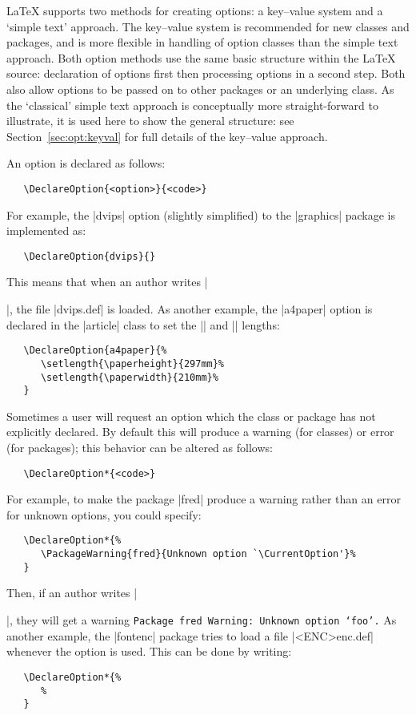 \documentclass{ltxguide}
\begin{document}
\LaTeX{} supports two methods for creating options: a key--value system and a
`simple text' approach. The key--value system is recommended for new classes
and packages, and is more flexible in handling of option classes than the
simple text approach. Both option methods use the same basic structure within
the \LaTeX{} source: declaration of options first then processing options in a
second step. Both also allow options to be passed on to other packages or an
underlying class. As the `classical' simple text approach is conceptually more
straight-forward to illustrate, it is used here to show the general structure:
see Section~\ref{sec:opt:keyval} for full details of the key--value approach.

An option is declared as follows:
\begin{verbatim}
   \DeclareOption{<option>}{<code>}
\end{verbatim}
For example, the |dvips| option (slightly simplified)
to the |graphics| package is implemented as:
\begin{verbatim}
   \DeclareOption{dvips}{}
\end{verbatim}
This means that when an author writes |\usepackage[dvips]{graphics}|, the file
|dvips.def| is loaded. As another example, the |a4paper| option is declared in
the |article| class to set the |\paperheight| and |\paperwidth| lengths:
\begin{verbatim}
   \DeclareOption{a4paper}{%
      \setlength{\paperheight}{297mm}%
      \setlength{\paperwidth}{210mm}%
   }
\end{verbatim}
Sometimes a user will request an option which the class or package has not
explicitly declared. By default this will produce a warning (for classes) or
error (for packages); this behavior can be altered as follows:
\begin{verbatim}
   \DeclareOption*{<code>}
\end{verbatim}
For example, to make the package |fred| produce a warning rather than an error
for unknown options, you could specify:
\begin{verbatim}
   \DeclareOption*{%
      \PackageWarning{fred}{Unknown option `\CurrentOption'}%
   }
\end{verbatim}
Then, if an author writes |\usepackage[foo]{fred}|, they will get a warning
\texttt{Package fred Warning: Unknown option `foo'.} As another example, the
|fontenc| package tries to load a file |<ENC>enc.def| whenever the 
option is used. This can be done by writing:
\begin{verbatim}
   \DeclareOption*{%
      %
   }
\end{verbatim}
\end{document}
